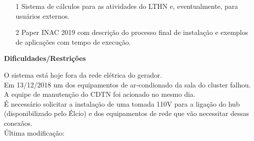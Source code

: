 \begin{itemize}
	\item[1] Sistema de cálculos para as atividades do LTHN e, eventualmente, para usuários externos.
	\item[2] Paper INAC 2019 com descrição do processo final de instalação e exemplos de aplicações com tempo de execução.

\end{itemize}


\textbf{Dificuldades/Restrições}

O sistema está hoje fora da rede elétrica do gerador.\\

Em 13/12/2018 um dos equipamentos de ar-condionado da sala do cluster falhou. A equipe de manutenção do CDTN foi acionado no mesmo dia.\\

É necessário solicitar a instalação de uma tomada 110V para a ligação do hub 
(disponibilizado pelo Élcio) e dos equipamentos de rede que vão necessitar 
dessas conexãos.\\

Última modificação: \date{\today}

